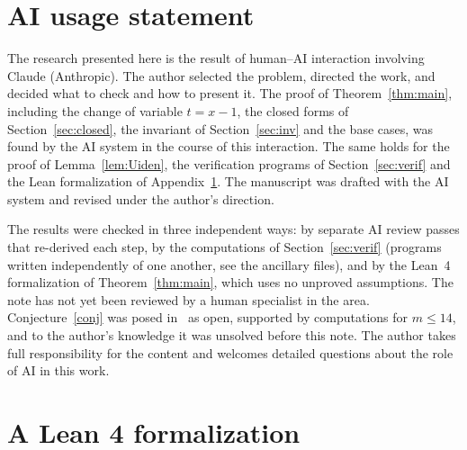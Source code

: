 \documentclass[11pt]{amsart}
\theoremstyle{definition}
\theoremstyle{remark}
\begin{document}
\section*{AI usage statement}
The research presented here is the result of human--AI interaction involving Claude (Anthropic). The author selected the problem, directed the work, and decided what to check and how to present it. The proof of Theorem~\ref{thm:main}, including the change of variable $t=x-1$, the closed forms of Section~\ref{sec:closed}, the invariant of Section~\ref{sec:inv} and the base cases, was found by the AI system in the course of this interaction. The same holds for the proof of Lemma~\ref{lem:Uiden}, the verification programs of Section~\ref{sec:verif} and the Lean formalization of Appendix~\ref{app:lean}. The manuscript was drafted with the AI system and revised under the author's direction.

The results were checked in three independent ways: by separate AI review passes that re-derived each step, by the computations of Section~\ref{sec:verif} (programs written independently of one another, see the ancillary files), and by the Lean~4 formalization of Theorem~\ref{thm:main}, which uses no unproved assumptions. The note has not yet been reviewed by a human specialist in the area. Conjecture~\ref{conj} was posed in~\cite{ST} as open, supported by computations for $m\le14$, and to the author's knowledge it was unsolved before this note. The author takes full responsibility for the content and welcomes detailed questions about the role of AI in this work.

\appendix
\section{A Lean 4 formalization}\label{app:lean}
\end{document}
